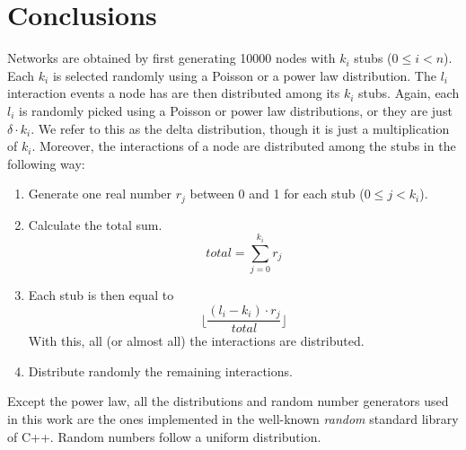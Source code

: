 \section{Conclusions}
Networks are obtained by first generating 10000 nodes with $k_i$ stubs ($0 \leq i < n$). Each $k_i$ is selected randomly using a Poisson or a power law distribution. The $l_i$ interaction events a node has are then distributed among its $k_i$ stubs. Again, each $l_i$ is randomly picked using a Poisson or power law distributions, or they are just $\delta \cdot k_i$. We refer to this as the delta distribution, though it is just a multiplication of $k_i$. Moreover, the interactions of a node are distributed among the stubs in the following way:
\begin{enumerate}
    \item Generate one real number $r_j$ between 0 and 1 for each stub ($0 \leq j < k_i$).
    \item Calculate the total sum. $$total = \sum_{j=0}^{k_i}r_j$$
    \item Each stub is then equal to $$\lfloor \frac{(l_i-k_i)\cdot r_j}{total}\rfloor$$
    With this, all (or almost all) the interactions are distributed.
    \item Distribute randomly the remaining interactions.
\end{enumerate}

Except the power law, all the distributions and random number generators used in this work are the ones implemented in the well-known \textit{random} standard library of C++. Random numbers follow a uniform distribution.